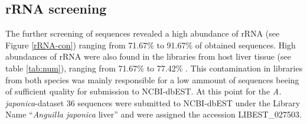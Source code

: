 \subsection*{rRNA screening}
\label{rRNA-pil}

The further screening of sequences revealed a high abundance of rRNA
(see Figure \ref{rRNA-con}) ranging from 71.67\% to 91.67\% of
obtained sequences.  High abundances of rRNA were also found in the
libraries from host liver tissue (see table \ref{tab:num}), ranging
from 71.67\% to 77.42\% . This contamination in libraries from both
species was mainly responsible for a low ammount of sequences beeing
of sufficient quality for submission to NCBI-dbEST. At this point for
the \textit{A. japonica}-dataset 36 sequences were submitted to
NCBI-dbEST under the Library Name ``\textit{Anguilla japonica} liver''
and were assigned the accession LIBEST\_027503.


